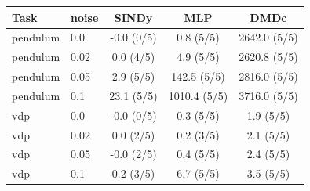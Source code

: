 \begin{tabular}{llccc}\toprule
Task & noise & SINDy & MLP & DMDc \\\midrule
pendulum & 0.0 & -0.0 (0/5) & 0.8 (5/5) & 2642.0 (5/5) \\
pendulum & 0.02 & 0.0 (4/5) & 4.9 (5/5) & 2620.8 (5/5) \\
pendulum & 0.05 & 2.9 (5/5) & 142.5 (5/5) & 2816.0 (5/5) \\
pendulum & 0.1 & 23.1 (5/5) & 1010.4 (5/5) & 3716.0 (5/5) \\
vdp & 0.0 & -0.0 (0/5) & 0.3 (5/5) & 1.9 (5/5) \\
vdp & 0.02 & 0.0 (2/5) & 0.2 (3/5) & 2.1 (5/5) \\
vdp & 0.05 & -0.0 (2/5) & 0.4 (5/5) & 2.4 (5/5) \\
vdp & 0.1 & 0.2 (3/5) & 6.7 (5/5) & 3.5 (5/5) \\
\bottomrule\end{tabular}
